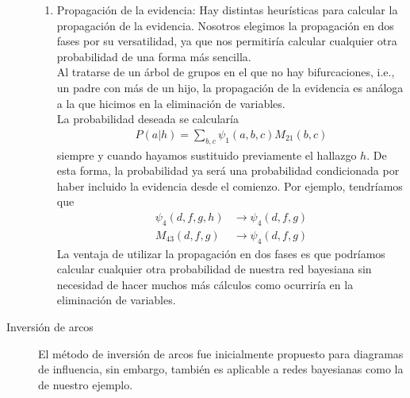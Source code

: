 \documentclass[12pt,a4paper]{article}
\begin{document}
\begin{description}
\begin{enumerate}
        \item Propagación de la evidencia: Hay distintas heurísticas para calcular la propagación de la evidencia. Nosotros elegimos la propagación en dos fases por su versatilidad, ya que nos permitiría calcular cualquier otra probabilidad de una forma más sencilla.\\
        
        Al tratarse de un árbol de grupos en el que no hay bifurcaciones, i.e., un padre con más de un hijo, la propagación de la evidencia es análoga a la que hicimos en la eliminación de variables.\\
        La probabilidad deseada se calcularía 
        \begin{align*}
            P(a | h) = \sum_{b, c} \psi_1(a, b, c) M_{21}(b, c)
        \end{align*}
        siempre y cuando hayamos sustituido previamente el hallazgo $h$. De esta forma, la probabilidad ya será una probabilidad condicionada por haber incluido la evidencia desde el comienzo. Por ejemplo, tendríamos que 
        \begin{align*}
            \psi_4(d, f, g, h) & \longrightarrow \psi_4(d, f, g) \\
            M_{43}(d, f, g) & \longrightarrow \psi_4(d, f, g)
        \end{align*}
        La ventaja de utilizar la propagación en dos fases es que podríamos calcular cualquier otra probabilidad de nuestra red bayesiana sin necesidad de hacer muchos más cálculos como ocurriría en la eliminación de variables.
    \end{enumerate}
    \item[Inversión de arcos] El método de inversión de arcos fue inicialmente propuesto para diagramas de influencia, sin embargo, también es aplicable a redes bayesianas como la de nuestro ejemplo.\\
    

\end{description}
\end{document}
